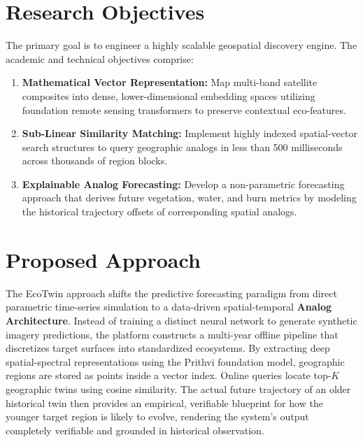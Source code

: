 \documentclass[11pt,a4paper]{article}
\begin{document}
\section{Research Objectives}
The primary goal is to engineer a highly scalable geospatial discovery engine. The academic and technical objectives comprise:
\begin{enumerate}
    \item \textbf{Mathematical Vector Representation:} Map multi-band satellite composites into dense, lower-dimensional embedding spaces utilizing foundation remote sensing transformers to preserve contextual eco-features.
    \item \textbf{Sub-Linear Similarity Matching:} Implement highly indexed spatial-vector search structures to query geographic analogs in less than 500 milliseconds across thousands of region blocks.
    \item \textbf{Explainable Analog Forecasting:} Develop a non-parametric forecasting approach that derives future vegetation, water, and burn metrics by modeling the historical trajectory offsets of corresponding spatial analogs.
\end{enumerate}

\section{Proposed Approach}
The EcoTwin approach shifts the predictive forecasting paradigm from direct parametric time-series simulation to a data-driven spatial-temporal \textbf{Analog Architecture}. Instead of training a distinct neural network to generate synthetic imagery predictions, the platform constructs a multi-year offline pipeline that discretizes target surfaces into standardized ecosystems. By extracting deep spatial-spectral representations using the Prithvi foundation model, geographic regions are stored as points inside a vector index. Online queries locate top-$K$ geographic twins using cosine similarity. The actual future trajectory of an older historical twin then provides an empirical, verifiable blueprint for how the younger target region is likely to evolve, rendering the system's output completely verifiable and grounded in historical observation.

\end{document}
